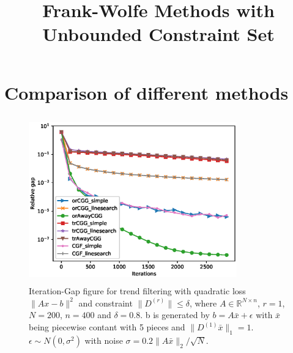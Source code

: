 \documentclass[english]{article}
\newcommand{\R}{\mathbb{R}}
\begin{document}
	\title{Frank-Wolfe Methods with Unbounded Constraint Set}
	\maketitle

\section{Comparison of different methods}


\begin{figure}[htbp]
	\centering
	\includegraphics[height=7.2cm,width=9cm]{Images/Leastsquare_Iterations_vs_RelativeGap_5.eps}
	\caption{Iteration-Gap figure for trend filtering with quadratic loss $\| Ax-b\|^2$ and constraint $\|D^{(r)}\| \le \delta$, where $A\in \R^{N\times n}$, $r=1$, $N=200$, $n=400$ and $\delta= 0.8$. b is generated by $b = A\bar x +\epsilon$ with $\bar x$ being piecewise contant with 5 pieces and $\|D^{(1)} \bar x\|_1 = 1$. $\epsilon \sim N(0, \sigma^2)$ with noise $\sigma= 0.2 \|A\bar x\|_2 / \sqrt{N}$.   }
	\label{Iteration-Gap5}
\end{figure}
\end{document}
